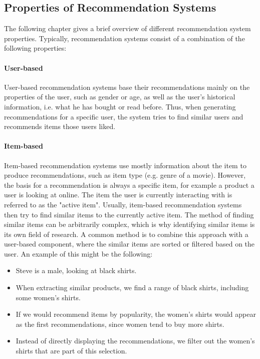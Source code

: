 \subsection{Properties of Recommendation Systems}
The following chapter gives a brief overview of different recommendation system properties.
Typically, recommendation systems consist of a combination of the following properties:
\paragraph{User-based}
User-based recommendation systems base their recommendations mainly on the properties of the user, such as gender or age, as well as the user's historical information, i.e. what he has bought or read before.
Thus, when generating recommendations for a specific user, the system tries to find similar users and recommends items those users liked.
\paragraph{Item-based}
Item-based recommendation systems use mostly information about the item to produce recommendations, such as item type (e.g. genre of a movie).
However, the basis for a recommendation is always a specific item, for example a product a user is looking at online.
The item the user is currently interacting with is referred to as the "active item". 
Usually, item-based recommendation systems then try to find similar items to the currently active item.
The method of finding similar items can be arbitrarily complex, which is why identifying similar items is its own field of research.
A common method is to combine this approach with a user-based component, where the similar items are sorted or filtered based on the user.
An example of this might be the following:
\begin{itemize}
    \item Steve is a male, looking at black shirts.
    \item When extracting similar products, we find a range of black shirts, including some women's shirts.
    \item If we would recommend items by popularity, the women's shirts would appear as the first recommendations, since women tend to buy more shirts.
    \item Instead of directly displaying the recommendations, we filter out the women's shirts that are part of this selection.
\end{itemize}

